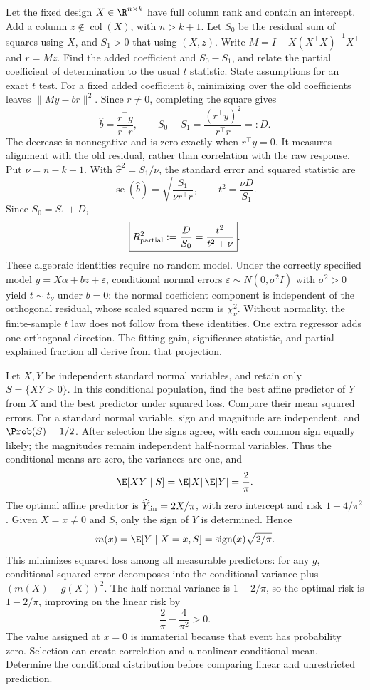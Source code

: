 Let the fixed design $X\in\R^{n\times k}$ have full column rank and contain an intercept. Add a column $z\notin\operatorname{col}(X)$, with $n>k+1$. Let $S_0$ be the residual sum of squares using $X$, and $S_1>0$ that using $(X,z)$. Write $M=I-X(X^\top X)^{-1}X^\top$ and $r=Mz$. Find the added coefficient and $S_0-S_1$, and relate the partial coefficient of determination to the usual $t$ statistic. State assumptions for an exact $t$ test.
\solution For a fixed added coefficient $b$, minimizing over the old coefficients leaves $\|My-br\|^2$. Since $r\ne0$, completing the square gives
\[
 \widehat b=\frac{r^\top y}{r^\top r},\qquad
 S_0-S_1=\frac{(r^\top y)^2}{r^\top r}=:D.
\]
The decrease is nonnegative and is zero exactly when $r^\top y=0$. It measures alignment with the old residual, rather than correlation with the raw response.
Put $\nu=n-k-1$. With $\widehat\sigma^2=S_1/\nu$, the standard error and squared statistic are
\[
 \operatorname{se}(\widehat b)=\sqrt{\frac{S_1}{\nu r^\top r}},
 \qquad t^2=\frac{\nu D}{S_1}.
\]
Since $S_0=S_1+D$,
\[
 \boxed{R^2_{\rm partial}:=\frac{D}{S_0}
       =\frac{t^2}{t^2+\nu}}.
\]
These algebraic identities require no random model. Under the correctly specified model $y=X\alpha+bz+\varepsilon$, conditional normal errors $\varepsilon\sim N(0,\sigma^2I)$ with $\sigma^2>0$ yield $t\sim t_\nu$ under $b=0$: the normal coefficient component is independent of the orthogonal residual, whose scaled squared norm is $\chi^2_\nu$. Without normality, the finite-sample $t$ law does not follow from these identities.
\insight One extra regressor adds one orthogonal direction. The fitting gain, significance statistic, and partial explained fraction all derive from that projection.

Let $X,Y$ be independent standard normal variables, and retain only $S=\{XY>0\}$. In this conditional population, find the best affine predictor of $Y$ from $X$ and the best predictor under squared loss. Compare their mean squared errors.
\solution For a standard normal variable, sign and magnitude are independent, and $\Prob(S)=1/2$. After selection the signs agree, with each common sign equally likely; the magnitudes remain independent half-normal variables. Thus the conditional means are zero, the variances are one, and
\[
 \E[XY\mid S]=\E|X|\,\E|Y|=\frac2\pi.
\]
The optimal affine predictor is $\widehat Y_{\rm lin}=2X/\pi$, with zero intercept and risk $1-4/\pi^2$.
Given $X=x\ne0$ and $S$, only the sign of $Y$ is determined. Hence
\[
 m(x)=\E[Y\mid X=x,S]
 =\operatorname{sign}(x)\sqrt{2/\pi}.
\]
This minimizes squared loss among all measurable predictors: for any $g$, conditional squared error decomposes into the conditional variance plus $(m(X)-g(X))^2$. The half-normal variance is $1-2/\pi$, so the optimal risk is $1-2/\pi$, improving on the linear risk by
\[
 \frac2\pi-\frac4{\pi^2}>0.
\]
The value assigned at $x=0$ is immaterial because that event has probability zero.
\insight Selection can create correlation and a nonlinear conditional mean. Determine the conditional distribution before comparing linear and unrestricted prediction.

